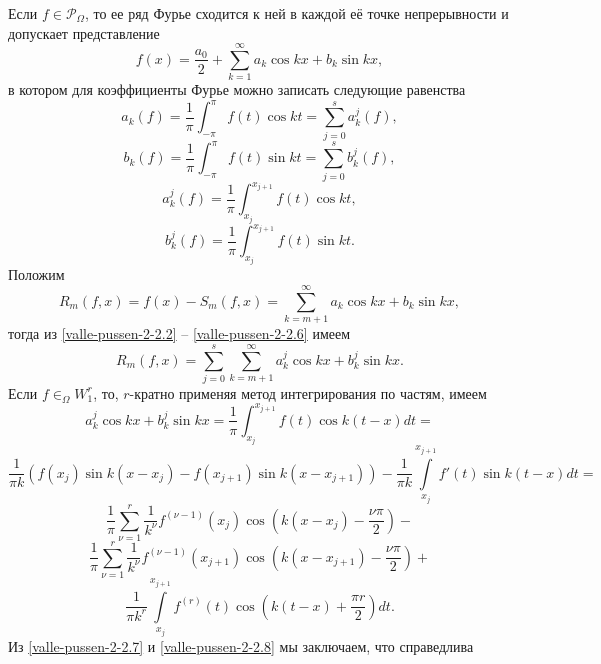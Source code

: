 Если $f\in \mathcal{ P}_\Omega$, то ее ряд Фурье сходится к ней в каждой её точке непрерывности и допускает представление
\begin{equation}\label{valle-pussen-2-2.1}
    f(x) = \frac{a_0}{2}+ \sum_{k=1}^\infty a_k\cos kx+b_k\sin kx,
\end{equation}
в котором для коэффициенты Фурье можно записать следующие равенства
\begin{equation}\label{valle-pussen-2-2.2}
a_k(f)=\frac1\pi\int_{-\pi}^\pi f(t)\cos kt=\sum_{j=0}^s a_k^j(f),
   \end{equation}
\begin{equation}\label{valle-pussen-2-2.3}
b_k(f)=\frac1\pi\int_{-\pi}^\pi f(t)\sin kt=\sum_{j=0}^s b_k^j(f),
   \end{equation}
\begin{equation}\label{valle-pussen-2-2.4}
a_k^j(f)=\frac1\pi\int_{x_j}^{x_{j+1}} f(t)\cos kt,
   \end{equation}
\begin{equation}\label{valle-pussen-2-2.5}
b_k^j(f)=\frac1\pi\int_{x_j}^{x_{j+1}} f(t)\sin kt.
   \end{equation}
 Положим
\begin{equation}\label{valle-pussen-2-2.6}
R_m(f,x)=f(x)-S_m(f,x)=\sum_{k=m+1}^\infty a_k\cos kx+b_k\sin kx,
   \end{equation}
тогда из \eqref{valle-pussen-2-2.2} -- \eqref{valle-pussen-2-2.6} имеем
\begin{equation}\label{valle-pussen-2-2.7}
R_m(f,x)=\sum_{j=0}^s\sum_{k=m+1}^\infty a_k^j\cos kx+b_k^j\sin kx.
   \end{equation}
Если $f\in _\Omega W_1^r$, то, $r$-кратно применяя метод интегрирования по частям, имеем
$$
a_k^j\cos kx+b_k^j\sin kx=\frac1\pi\int_{x_j}^{x_{j+1}}f(t)\cos k(t-x)dt=
$$
$$
\frac{1}{\pi k}(f(x_j)\sin k(x-x_j)-f(x_{j+1})\sin k(x-x_{j+1}))-\frac1{\pi k}\int\limits_{x_j}^{x_{j+1}}f'(t)\sin k(t-x)dt=
$$
$$
\frac{1}{\pi}
\sum_{\nu=1}^r\frac{1}{k^\nu}f^{(\nu-1)}(x_j)\cos\left(k(x-x_j)-\frac{\nu\pi}{2}\right)-
$$
$$
\frac{1}{\pi}
\sum_{\nu=1}^r\frac{1}{k^\nu} f^{(\nu-1)}(x_{j+1})\cos\left(k(x-x_{j+1})-\frac{\nu\pi}{2}\right)+
$$
\begin{equation}\label{valle-pussen-2-2.8}
\frac1{\pi k^r}\int\limits_{x_j}^{x_{j+1}}f^{(r)}(t)\cos\left(k(t-x)+\frac{\pi r}{2}\right)dt.
   \end{equation}
Из \eqref{valle-pussen-2-2.7} и \eqref{valle-pussen-2-2.8} мы заключаем, что справедлива
